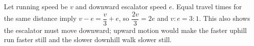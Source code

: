 Let running speed be $v$ and downward escalator speed $e$. Equal travel times for the same distance imply $v-e=\dfrac{v}{3}+e$, so $\dfrac{2v}{3}=2e$ and $\boxed{v:e=3:1}$. This also shows the escalator must move downward; upward motion would make the faster uphill run faster still and the slower downhill walk slower still.
